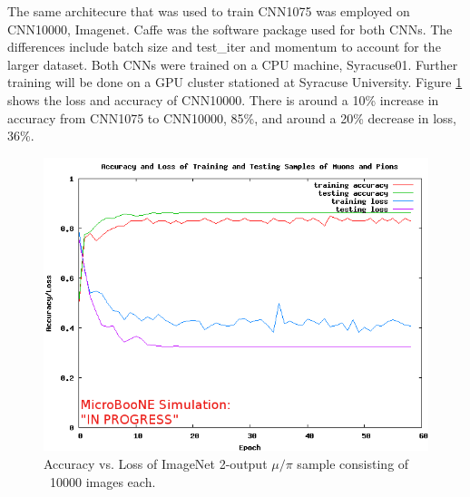 The same architecure that was used to train CNN1075 was employed on CNN10000, Imagenet. Caffe \cite{caffe} was the software package used for both CNNs. The differences include batch size and test{\_}iter and momentum to account for the larger dataset. Both CNNs were trained on a CPU machine, Syracuse01. Further training will be done on a GPU cluster stationed at Syracuse University. Figure \ref{fig:loss_accuracy} shows the loss and accuracy of CNN10000. There is around a 10\% increase in accuracy from CNN1075 to CNN10000, 85\%, and around a 20\% decrease in loss, 36\%.      

\begin{figure}[htp!]
\centering
\includegraphics[scale=.4]{figs/acc_loss_10000_062117.png}
\caption{Accuracy vs. Loss of ImageNet 2-output $\mu/\pi$ sample consisting of ~10000 images each.} 
\label{fig:loss_accuracy}
\end{figure}

